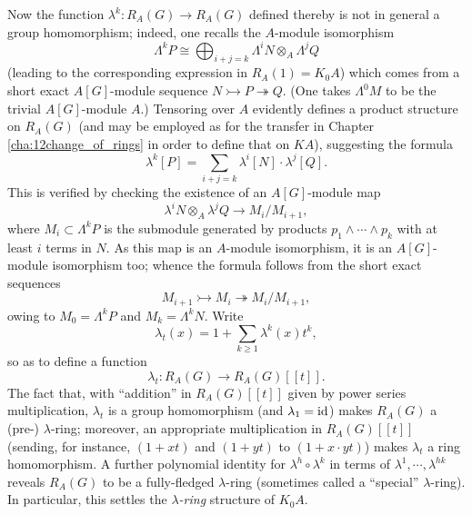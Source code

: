 Now the function $\lambda^k \colon R_A(G) \longrightarrow R_A(G)$ defined thereby is not in general a group homomorphism; indeed, one recalls the $A$-module isomorphism
\[\Lambda^kP \cong \bigoplus_{i+j=k} \Lambda^i N\otimes_A \Lambda^jQ\]
(leading to the corresponding expression in $R_A(1) = K_0A$) which comes from a short exact $A[G]$-module sequence $N \rightarrowtail P \twoheadrightarrow Q$. (One takes $\Lambda^0M$ to be the trivial $A[G]$-module $A$.) Tensoring over $A$ evidently defines a product structure on $R_A(G)$ (and may be employed as for the transfer in Chapter \ref{cha:12change_of_rings} in order to define that on $KA$), suggesting the formula 
\[\lambda^k[P] = \sum_{i+j=k} \lambda^i[N] \cdot \lambda^j[Q].\]
This is verified by checking the existence of an $A[G]$-module map
\[\lambda^iN \otimes_A \lambda^jQ\longrightarrow M_i/M_{i+1},\]
where $M_i \subset \Lambda^kP$ is the submodule generated by products $p_1\wedge\cdots \wedge p_k$ with at least $i$ terms in $N$. As this map is an $A$-module isomorphism, it is an $A[G]$-module isomorphism too; whence the
formula follows from the short exact sequences
\[M_{i+1}\rightarrowtail M_{i} \twoheadrightarrow M_{i}/M_{i+1},\]
owing to $M_0 = \Lambda^kP$ and $M_k = \Lambda^kN$. Write
\[\lambda_t(x) =1+\sum_{k\geqslant 1} \lambda^k(x) t^k , \]
so as to define a function
\[\lambda_t \colon R_A(G)\longrightarrow R_A(G)[[t]].\]
The fact that, with ``addition'' in $R_A(G)[[t]]$ given by power series multiplication, $\lambda_t$ is a group homomorphism (and $\lambda_1 = \mathrm{id}$) makes $R_A(G)$ a (pre-) $\lambda$-ring; moreover, an appropriate multiplication in $R_A(G)[[t]]$ (sending, for instance, $(1+xt)$ and $(1+yt)$ to $(1+x\cdot yt)$) makes $\lambda_t$ a ring homomorphism. A further polynomial identity for $\lambda^h\circ \lambda^k$ in terms of $\lambda^{1}, \cdots, \lambda^{hk}$ reveals $R_A(G)$ to be a fully-fledged $\lambda$-ring (sometimes called a ``special'' $\lambda$-ring). In particular, this settles the {\em $\lambda$-ring}  structure of $K_0A$.

